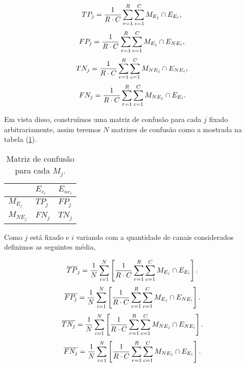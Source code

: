 \begin{equation}\label{cap_fusao_05}
	TP_j= \frac{1}{R\cdot C}\sum_{r=1}^{R}\sum_{c=1}^{C} M_{E_j}\cap E_{E_i}, \\
\end{equation}
\begin{equation}\label{cap_fusao_06}
	FP_j= \frac{1}{R\cdot C}\sum_{r=1}^{R}\sum_{c=1}^{C} M_{E_j}\cap E_{NE_i}, \\
\end{equation}
\begin{equation}\label{cap_fusao_07}
	TN_j= \frac{1}{R\cdot C}\sum_{r=1}^{R}\sum_{c=1}^{C} M_{NE_j}\cap E_{NE_i}, \\
\end{equation}
\begin{equation}\label{cap_fusao_08}
	FN_j= \frac{1}{R\cdot C}\sum_{r=1}^{R}\sum_{c=1}^{C} M_{NE_j}\cap E_{E_i}. \\
\end{equation}

Em vista disso, construímos uma matriz de confusão para cada $j$ fixado arbitrariamente, assim teremos $N$ matrizes de confusão como a mostrada na tabela (\ref{cap_fusao_tab03}).

\begin{table}[htb!]
	\centering
	\caption{Matriz de confusão para cada $M_j$.}\label{cap_fusao_tab03}
\begin{tabular}{@{}lll@{}} \toprule
	& $E_{e_i}$  & $E_{ne_i}$  \\ \midrule
	$M_{E_j}$    & $TP_j$ &  $FP_j$  \\ 
	$M_{NE_j}$   & $FN_j$ &  $TN_j$\\ \bottomrule 
\end{tabular}
\end{table}

Como $j$ está fixado e $i$ variando com a quantidade de canais considerados definimos as seguintes média,

\begin{equation}\label{cap_fusao_09}
	\overline{TP}_j=\frac{1}{N}\sum_{i=1}^{N} \left[ \frac{1}{R\cdot C}\sum_{r=1}^{R}\sum_{c=1}^{C} M_{E_j}\cap E_{E_i}\right]. \\
\end{equation}
\begin{equation}\label{cap_fusao_10}
	\overline{FP_j}=\frac{1}{N}\sum_{i=1}^{N} \left[ \frac{1}{R\cdot C}\sum_{r=1}^{R}\sum_{c=1}^{C} M_{E_j}\cap E_{NE_i}\right]. \\
\end{equation}
\begin{equation}\label{cap_fusao_11}
	\overline{TN_j}=\frac{1}{N}\sum_{i=1}^{N} \left[ \frac{1}{R\cdot C}\sum_{r=1}^{R}\sum_{c=1}^{C} M_{NE_j}\cap E_{NE_i}\right]. \\
\end{equation}
\begin{equation}\label{cap_fusao_12}
	\overline{FN_j}=\frac{1}{N}\sum_{i=1}^{N} \left[ \frac{1}{R\cdot C}\sum_{r=1}^{R}\sum_{c=1}^{C} M_{NE_j}\cap E_{E_i}\right]. \\
\end{equation}

